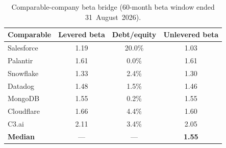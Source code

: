 \begin{table}[H]
\centering
\caption{Comparable-company beta bridge (60-month beta window ended 31~August~2026).}
\label{tab:beta}
\begin{tabular}{lccc}
\toprule
Comparable & Levered beta & Debt/equity & Unlevered beta \\
\midrule
Salesforce & 1.19 & 20.0\% & 1.03 \\
Palantir & 1.61 & 0.0\% & 1.61 \\
Snowflake & 1.33 & 2.4\% & 1.30 \\
Datadog & 1.48 & 1.5\% & 1.46 \\
MongoDB & 1.55 & 0.2\% & 1.55 \\
Cloudflare & 1.66 & 4.4\% & 1.60 \\
C3.ai & 2.11 & 3.4\% & 2.05 \\
\midrule
\textbf{Median} & --- & --- & \textbf{1.55} \\
\bottomrule
\end{tabular}
\end{table}
